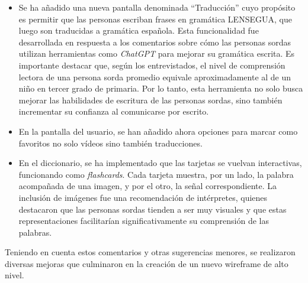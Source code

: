 \begin{itemize}
    \item 
    Se ha añadido una nueva pantalla denominada ``Traducción'' cuyo propósito es permitir que las personas escriban frases en gramática LENSEGUA, que luego son traducidas a gramática española. Esta funcionalidad fue desarrollada en respuesta a los comentarios sobre cómo las personas sordas utilizan herramientas como \textit{ChatGPT} para mejorar su gramática escrita. Es importante destacar que, según los entrevistados, el nivel de comprensión lectora de una persona sorda promedio equivale aproximadamente al de un niño en tercer grado de primaria. Por lo tanto, esta herramienta no solo busca mejorar las habilidades de escritura de las personas sordas, sino también incrementar su confianza al comunicarse por escrito.
    
    \item
    En la pantalla del usuario, se han añadido ahora opciones para marcar como favoritos no solo vídeos sino también traducciones.
    
    \item 
    En el diccionario, se ha implementado que las tarjetas se vuelvan interactivas, funcionando como \textit{flashcards}. Cada tarjeta muestra, por un lado, la palabra acompañada de una imagen, y por el otro, la señal correspondiente. La inclusión de imágenes fue una recomendación de intérpretes, quienes destacaron que las personas sordas tienden a ser muy visuales y que estas representaciones facilitarían significativamente su comprensión de las palabras.
    
\end{itemize}

Teniendo en cuenta estos comentarios y otras sugerencias menores, se realizaron diversas mejoras que culminaron en la creación de un nuevo wireframe de alto nivel.

